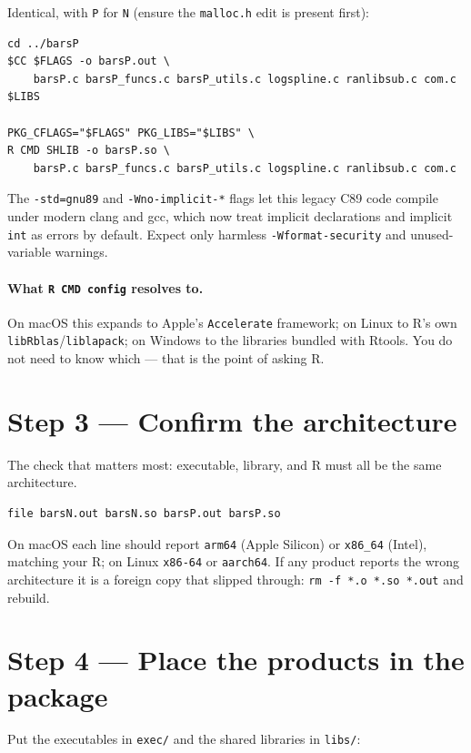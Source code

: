 \documentclass[11pt]{article}
\begin{document}
Identical, with \texttt{P} for \texttt{N} (ensure the \texttt{malloc.h} edit is
present first):

\begin{lstlisting}
cd ../barsP
$CC $FLAGS -o barsP.out \
    barsP.c barsP_funcs.c barsP_utils.c logspline.c ranlibsub.c com.c $LIBS

PKG_CFLAGS="$FLAGS" PKG_LIBS="$LIBS" \
R CMD SHLIB -o barsP.so \
    barsP.c barsP_funcs.c barsP_utils.c logspline.c ranlibsub.c com.c
\end{lstlisting}

The \texttt{-std=gnu89} and \texttt{-Wno-implicit-*} flags let this legacy
C89 code compile under modern clang and gcc, which now treat implicit
declarations and implicit \texttt{int} as errors by default. Expect only harmless
\texttt{-Wformat-security} and unused-variable warnings.

\paragraph{What \texttt{R CMD config} resolves to.}
On macOS this expands to Apple's \texttt{Accelerate} framework; on Linux to R's
own \texttt{libRblas}/\texttt{liblapack}; on Windows to the libraries bundled with
Rtools. You do not need to know which --- that is the point of asking R.

\section{Step 3 --- Confirm the architecture}

The check that matters most: executable, library, and R must all be the same
architecture.

\begin{lstlisting}
file barsN.out barsN.so barsP.out barsP.so
\end{lstlisting}

On macOS each line should report \texttt{arm64} (Apple Silicon) or
\texttt{x86\_64} (Intel), matching your R; on Linux \texttt{x86-64} or
\texttt{aarch64}. If any product reports the wrong architecture it is a foreign
copy that slipped through: \texttt{rm -f *.o *.so *.out} and rebuild.

\section{Step 4 --- Place the products in the package}

Put the executables in \texttt{exec/} and the shared libraries in \texttt{libs/}:
\end{document}
